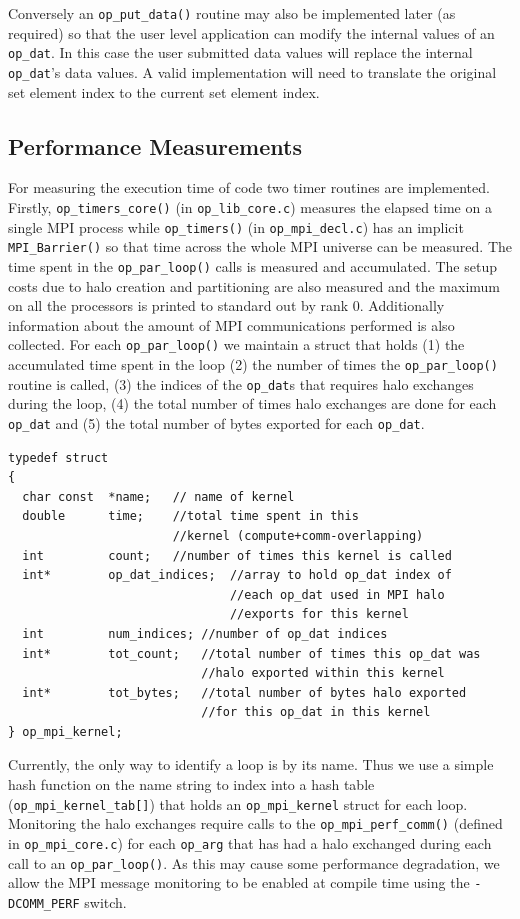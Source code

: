 \documentclass[11pt]{article}
\begin{document}
\noindent Conversely an \texttt{op\_put\_data()} routine may also be implemented later (as required) so that the user
level application can modify the internal values of an \texttt{op\_dat}. In this case the user submitted data values
will replace the internal \texttt{op\_dat}'s data values. A valid implementation will need to translate the original set
element index to the current set element index.


\subsection{Performance Measurements}\label{subsec/perf}

For measuring the execution time of code two timer routines are implemented.
Firstly, \texttt{op\_timers\_core()} (in \texttt{op\_lib\_core.c}) measures the
elapsed time on a single MPI process while \texttt{op\_timers()} (in
\texttt{op\_mpi\_decl.c}) has an implicit \texttt{MPI\_Barrier()} so that time
across the whole MPI universe can be measured. \noindent The time spent in the
\texttt{op\_par\_loop()} calls is measured and accumulated. The setup costs due
to halo creation and partitioning are also measured and the maximum on all the
processors is printed to standard out by rank 0. Additionally information about
the amount of MPI communications performed is also collected. For each
\texttt{op\_par\_loop()} we maintain a struct that holds (1) the accumulated
time spent in the loop (2) the number of times the \texttt{op\_par\_loop()}
routine is called, (3) the indices of the \texttt{op\_dat}s that requires halo
exchanges during the loop, (4) the total number of times halo exchanges are done
for each \texttt{op\_dat} and (5) the total number of bytes exported for each
\texttt{op\_dat}.
\begin{verbatim}
typedef struct
{
  char const  *name;   // name of kernel
  double      time;    //total time spent in this
                       //kernel (compute+comm-overlapping)
  int         count;   //number of times this kernel is called
  int*        op_dat_indices;  //array to hold op_dat index of
                               //each op_dat used in MPI halo
                               //exports for this kernel
  int         num_indices; //number of op_dat indices
  int*        tot_count;   //total number of times this op_dat was
                           //halo exported within this kernel
  int*        tot_bytes;   //total number of bytes halo exported
                           //for this op_dat in this kernel
} op_mpi_kernel;
\end{verbatim}
\noindent Currently, the only way to identify a loop is by its name. Thus we use
a simple hash function on the name string to index into a hash table
(\texttt{op\_mpi\_kernel\_tab[]}) that holds an \texttt{op\_mpi\_kernel} struct
for each loop. Monitoring the halo exchanges require calls to
the \texttt{op\_mpi\_perf\_comm()} (defined in \texttt{op\_mpi\_core.c}) for
each \texttt{op\_arg} that has had a halo exchanged during each call to an
\texttt{op\_par\_loop()}. As this may cause some performance degradation, we
allow the MPI message monitoring to be enabled at compile time using the
\texttt{-DCOMM\_PERF} switch.
\end{document}
